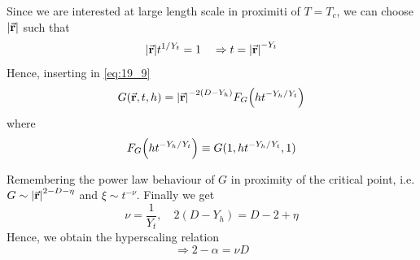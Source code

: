 \documentclass[../main/main.tex]{subfiles}
\begin{document}
Since we are interested at large length scale in proximiti of \( T=T_c \), we can choose \( \abs{\va{r}}  \) such that
\begin{equation}
  \abs{\va{r}} t^{1/Y_t} = 1  \quad \Rightarrow  t = \abs{\va{r}}^{-Y_t}
\end{equation}
Hence, inserting in \eqref{eq:19_9}
\begin{equation}
  G (\va{r},t,h) = \abs{\va{r}}^{-2(D-Y_h)} F_G \qty(h t^{-Y_h/Y_t})
\end{equation}
where
\begin{equation}
  F_G \qty(h t^{-Y_h/Y_t})  \equiv G (1, h t ^{-Y_h/Y_t},1)
\end{equation}

Remembering the power law behaviour of \( G \) in proximity of the critical point, i.e.  \( G \sim \abs{\va{r}}^{2-D- \eta }  \) and \( \xi \sim t^{-\nu } \).
Finally we get
\begin{equation}
  \nu = \frac{1}{Y_t}, \quad 2 (D- Y_h) = D - 2 + \eta
\end{equation}
Hence, we obtain the hyperscaling relation
\begin{equation}
      \Rightarrow 2 - \alpha = \nu D
\end{equation}
\end{document}
